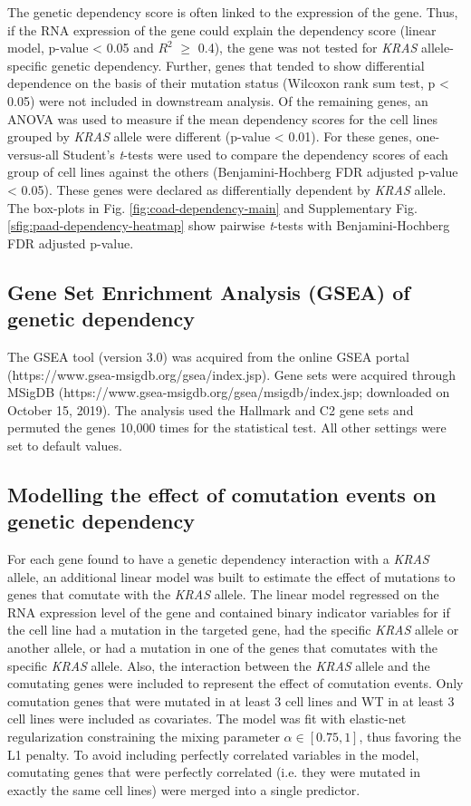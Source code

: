 \documentclass[english, 10pt, letterpaper]{article}
\newcommand{\KRAS}{\emph{KRAS}}
\begin{document}
The genetic dependency score is often linked to the expression of the gene.
Thus, if the RNA expression of the gene could explain the dependency score (linear model, p-value < 0.05 and $R^2$ $\ge$ 0.4), the gene was not tested for \KRAS{} allele-specific genetic dependency.
Further, genes that tended to show differential dependence on the basis of their mutation status (Wilcoxon rank sum test, p < 0.05) were not included in downstream analysis.
Of the remaining genes, an ANOVA was used to measure if the mean dependency scores for the cell lines grouped by \KRAS{} allele were different (p-value < 0.01).
For these genes, one-versus-all Student's \emph{t}-tests were used to compare the dependency scores of each group of cell lines against the others (Benjamini-Hochberg FDR adjusted p-value < 0.05).
These genes were declared as differentially dependent by \KRAS{} allele.
The box-plots in Fig. \ref{fig:coad-dependency-main} and Supplementary Fig. \ref{sfig:paad-dependency-heatmap} show pairwise \emph{t}-tests with Benjamini-Hochberg FDR adjusted p-value.


\subsection*{Gene Set Enrichment Analysis (GSEA) of genetic dependency}
The GSEA tool (version 3.0) was acquired from the online GSEA portal (https://www.gsea-msigdb.org/gsea/index.jsp).
Gene sets were acquired through MSigDB (https://www.gsea-msigdb.org/gsea/msigdb/index.jsp; downloaded on October 15, 2019).
The analysis used the Hallmark and C2 gene sets and permuted the genes 10,000 times for the statistical test.
All other settings were set to default values.


\subsection*{Modelling the effect of comutation events on genetic dependency}

For each gene found to have a genetic dependency interaction with a \KRAS{} allele, an additional linear model was built to estimate the effect of mutations to genes that comutate with the \KRAS{} allele.
The linear model regressed on the RNA expression level of the gene and contained binary indicator variables for if the cell line had a mutation in the targeted gene, had the specific \KRAS{} allele or another allele, or had a mutation in one of the genes that comutates with the specific \KRAS{} allele.
Also, the interaction between the \KRAS{} allele and the comutating genes were included to represent the effect of comutation events.
Only comutation genes that were mutated in at least 3 cell lines and WT in at least 3 cell lines were included as covariates.
The model was fit with elastic-net regularization \cite{Zou2005RegularizationNet, R-caret} constraining the mixing parameter $\alpha \in [0.75, 1]$, thus favoring the L1 penalty.
To avoid including perfectly correlated variables in the model, comutating genes that were perfectly correlated (i.e. they were mutated in exactly the same cell lines) were merged into a single predictor.
\end{document}
